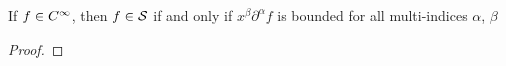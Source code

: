 \documentclass[../../main.tex]{subfiles}
\begin{document}
\begin{wts}
    If $f\in C^{\infty}$, then $f\in\mathcal{S}$ if and only if $x^\beta\partial^\alpha f$ is bounded for all multi-indices $\alpha$, $\beta$
\end{wts}
\begin{proof}

\end{proof}
\end{document}
